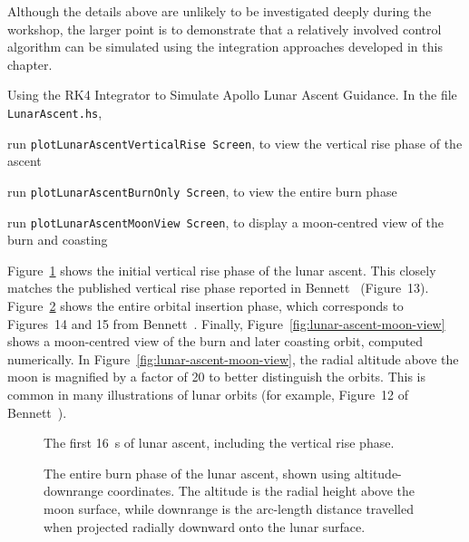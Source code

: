 \documentclass[12pt,openany]{book}
\newcommand{\filename}[1]{\texttt{#1}}  %
\newcommand{\code}[1]{\texttt{#1}}      %
\begin{document}
Although the details above are unlikely to be investigated deeply during the workshop, the larger point is to demonstrate that a relatively involved control algorithm can be simulated using the integration approaches developed in this chapter.

\begin{problem}[label=lunar-ascent-guidance]{Using the RK4 Integrator to Simulate Apollo Lunar Ascent Guidance.}
  In the file \filename{LunarAscent.hs},
  \begin{probitemize}
  \item run \code{plotLunarAscentVerticalRise Screen}, to view the vertical rise phase of the ascent
  \item run \code{plotLunarAscentBurnOnly Screen}, to view the entire burn phase
  \item run \code{plotLunarAscentMoonView Screen}, to display a moon-centred view of the burn and coasting 
  \end{probitemize}
\end{problem}

Figure~\ref{fig:lunar-ascent-vertical-rise} shows the initial vertical rise phase of the lunar ascent. This closely matches the published vertical rise phase reported in Bennett~\cite{bennett1970} (Figure~13). Figure~\ref{fig:lunar-ascent-burn-only} shows the entire orbital insertion phase, which corresponds to Figures~14 and 15 from Bennett~\cite{bennett1970}. Finally, Figure~\ref{fig:lunar-ascent-moon-view} shows a moon-centred view of the burn and later coasting orbit, computed numerically. In Figure~\ref{fig:lunar-ascent-moon-view}, the radial altitude above the moon is magnified by a factor of 20 to better distinguish the orbits. This is common in many illustrations of lunar orbits (for example, Figure~12 of Bennett~\cite{bennett1970}).

\begin{figure}[htbp]
  \resizebox{\textwidth}{!}{}
  \caption{The first \SI{16}{\s} of lunar ascent, including the vertical rise phase.}
  \label{fig:lunar-ascent-vertical-rise}
\end{figure}

\begin{figure}[htbp]
  \resizebox{\textwidth}{!}{}
  \caption{The entire burn phase of the lunar ascent, shown using altitude-downrange coordinates. The altitude is the radial height above the moon surface, while downrange is the arc-length distance travelled when projected radially downward onto the lunar surface.}
  \label{fig:lunar-ascent-burn-only}
\end{figure}
\end{document}
